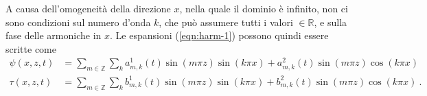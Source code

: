 \documentclass{article}
\begin{document}
A causa dell'omogeneità della direzione $x$, nella quale il dominio è infinito, non ci sono condizioni sul numero d'onda $k$, che può assumere tutti i valori $\in \mathbb{R}$, e sulla fase delle armoniche in $x$. Le espansioni (\ref{eqn:harm-1}) possono quindi essere scritte come
\begin{equation}\label{eqn:harm-2}
\begin{aligned}
    \psi(x,z,t) & = \sum_{m \in \mathbb{Z}} \sum_k a^1_{m,k}(t) \sin{(m\pi z)} \sin{(k\pi x )} +  a^2_{m,k}(t) \sin{(m\pi z)} \cos{(k \pi x)} \\
    \tau(x,z,t) & = \sum_{m \in \mathbb{Z}} \sum_k b^1_{m,k}(t) \sin{(m\pi z)} \sin{(k\pi x )} + b^2_{m,k}(t) \sin{(m\pi z)} \cos{(k \pi x)}  \ .
\end{aligned}
\end{equation}
\end{document}
